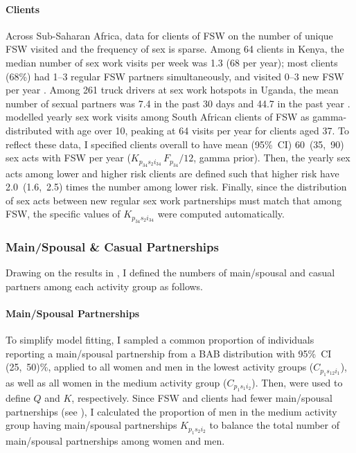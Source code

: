 \paragraph{Clients}
Across Sub-Saharan Africa, data for clients of FSW on
the number of unique FSW visited and the frequency of sex is sparse.
Among 64 clients in Kenya,
the median number of sex work visits per week was 1.3 (68 per year);
most clients (68\%) had 1--3 regular FSW partners simultaneously, and
visited 0--3 new FSW per year \cite{Voeten2002}.
Among 261 truck drivers at sex work hotspots in Uganda,
the mean number of sexual partners was
7.4 in the past 30 days and 44.7 in the past year \cite{Matovu2012}.
\citet{Johnson2017} modelled yearly sex work visits among South African clients of FSW as
gamma-distributed with age over 10, peaking at 64 visits per year for clients aged 37.
To reflect these data, I specified clients overall to have
mean (95\%~CI) 60~(35,~90) sex acts with FSW per year
($K_{p_{34}s_{2}i_{34}}\,F_{p_{34}}/12$, gamma prior).
Then, the yearly sex acts among lower and higher risk clients are defined such that
higher risk have 2.0~(1.6,~2.5) times the number among lower risk.
Finally, since the distribution of sex acts between new \vs regular sex work partnerships
must match that among FSW, the specific values of $K_{p_{34}s_{2}i_{34}}$
were computed automatically.
\subsubsection{Main/Spousal \& Casual Partnerships}\label{model.par.pnum.msc}
Drawing on the results in ,
I defined the numbers of main/spousal and casual partners
among each activity group as follows.
\paragraph{Main/Spousal Partnerships}
To simplify model fitting, I sampled a common proportion of
individuals reporting a main/spousal partnership from a BAB distribution with 95\%~CI (25,~50)\%,
applied to all women and men in the lowest activity groups ($C_{p_{1}s_{12}i_{1}}$),
as well as all women in the medium activity group ($C_{p_{1}s_{1}i_{2}}$).
Then,  were used to define $Q$ and $K$, respectively.
Since FSW and clients had fewer main/spousal partnerships (see ),
I calculated the proportion of men in the medium activity group having main/spousal partnerships
$K_{p_{1}s_{2}i_{2}}$ to balance the total number of main/spousal partnerships among women and men.
